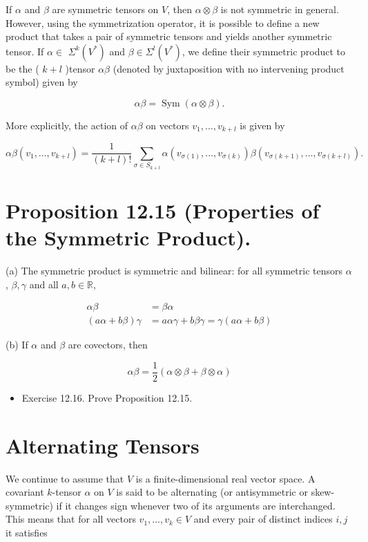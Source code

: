 \documentclass[10pt, letterpaper]{article}
\begin{document}
If $\alpha$ and $\beta$ are symmetric tensors on $V$, then $\alpha \otimes \beta$ is not symmetric in general. However, using the symmetrization operator, it is possible to define a new product that takes a pair of symmetric tensors and yields another symmetric tensor. If $\alpha \in$ $\Sigma^{k}\left(V^{*}\right)$ and $\beta \in \Sigma^{l}\left(V^{*}\right)$, we define their symmetric product to be the ( $k+l$ )tensor $\alpha \beta$ (denoted by juxtaposition with no intervening product symbol) given by

$$
\alpha \beta=\operatorname{Sym}(\alpha \otimes \beta) .
$$

More explicitly, the action of $\alpha \beta$ on vectors $v_{1}, \ldots, v_{k+l}$ is given by

$$
\alpha \beta\left(v_{1}, \ldots, v_{k+l}\right)=\frac{1}{(k+l)!} \sum_{\sigma \in S_{k+l}} \alpha\left(v_{\sigma(1)}, \ldots, v_{\sigma(k)}\right) \beta\left(v_{\sigma(k+1)}, \ldots, v_{\sigma(k+l)}\right) .
$$

\section*{Proposition 12.15 (Properties of the Symmetric Product).}
(a) The symmetric product is symmetric and bilinear: for all symmetric tensors $\alpha$, $\beta, \gamma$ and all $a, b \in \mathbb{R}$,

$$
\begin{aligned}
\alpha \beta & =\beta \alpha \\
(a \alpha+b \beta) \gamma & =a \alpha \gamma+b \beta \gamma=\gamma(a \alpha+b \beta)
\end{aligned}
$$

(b) If $\alpha$ and $\beta$ are covectors, then

$$
\alpha \beta=\frac{1}{2}(\alpha \otimes \beta+\beta \otimes \alpha)
$$

\begin{itemize}
  \item Exercise 12.16. Prove Proposition 12.15.
\end{itemize}

\section*{Alternating Tensors}
We continue to assume that $V$ is a finite-dimensional real vector space. A covariant $k$-tensor $\alpha$ on $V$ is said to be alternating (or antisymmetric or skew-symmetric) if it changes sign whenever two of its arguments are interchanged. This means that for all vectors $v_{1}, \ldots, v_{k} \in V$ and every pair of distinct indices $i, j$ it satisfies
\end{document}

